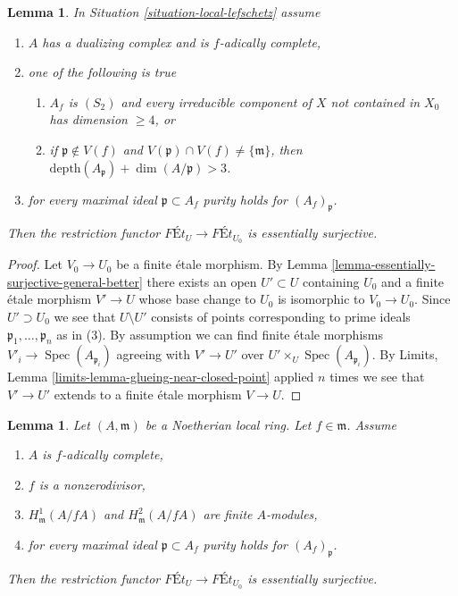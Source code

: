 \documentclass{stacks-project}
\theoremstyle{plain}
\newtheorem{lemma}[subsection]{Lemma}
\theoremstyle{definition}
\theoremstyle{remark}
\numberwithin{equation}{subsection}
\def\Spec{\mathop{\mathrm{Spec}}}
\begin{document}
\begin{lemma}
\label{lemma-equivalence-better}
In Situation \ref{situation-local-lefschetz} assume
\begin{enumerate}
\item $A$ has a dualizing complex and is $f$-adically complete,
\item one of the following is true
\begin{enumerate}
\item $A_f$ is $(S_2)$ and every irreducible component of $X$
not contained in $X_0$ has dimension $\geq 4$, or
\item if $\mathfrak p \not \in V(f)$ and
$V(\mathfrak p) \cap V(f) \not = \{\mathfrak m\}$, then
$\text{depth}(A_\mathfrak p) + \dim(A/\mathfrak p) > 3$.
\end{enumerate}
\item for every maximal ideal $\mathfrak p \subset A_f$
purity holds for $(A_f)_\mathfrak p$.
\end{enumerate}
Then the restriction functor $\textit{F\'Et}_U \to \textit{F\'Et}_{U_0}$
is essentially surjective.
\end{lemma}

\begin{proof}
Let $V_0 \to U_0$ be a finite \'etale morphism. By
Lemma \ref{lemma-essentially-surjective-general-better}
there exists an open $U' \subset U$ containing $U_0$ and
a finite \'etale morphism $V' \to U$ whose base change to $U_0$
is isomorphic to $V_0 \to U_0$. Since $U' \supset U_0$
we see that $U \setminus U'$ consists of points corresponding
to prime ideals $\mathfrak p_1, \ldots, \mathfrak p_n$ as in (3).
By assumption we can find finite \'etale morphisms
$V'_i \to \Spec(A_{\mathfrak p_i})$ agreeing with
$V' \to U'$ over $U' \times_U \Spec(A_{\mathfrak p_i})$.
By Limits, Lemma \ref{limits-lemma-glueing-near-closed-point}
applied $n$ times we see that $V' \to U'$ extends to a finite \'etale
morphism $V \to U$.
\end{proof}

\begin{lemma}
\label{lemma-equivalence}
Let $(A, \mathfrak m)$ be a Noetherian local ring.
Let $f \in \mathfrak m$. Assume
\begin{enumerate}
\item $A$ is $f$-adically complete,
\item $f$ is a nonzerodivisor,
\item $H^1_\mathfrak m(A/fA)$ and $H^2_\mathfrak m(A/fA)$ are finite
$A$-modules,
\item for every maximal ideal $\mathfrak p \subset A_f$
purity holds for $(A_f)_\mathfrak p$.
\end{enumerate}
Then the restriction functor $\textit{F\'Et}_U \to \textit{F\'Et}_{U_0}$
is essentially surjective.
\end{lemma}
\end{document}
